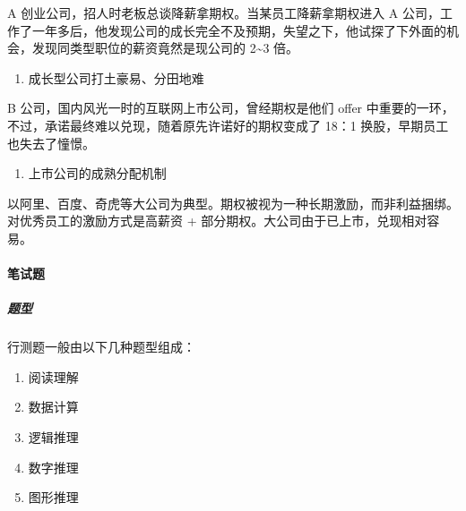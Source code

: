 \documentclass[letterpaper,10pt,english]{sphinxmanual}
\begin{document}
A 创业公司，招人时老板总谈降薪拿期权。当某员工降薪拿期权进入 A
公司，工作了一年多后，他发现公司的成长完全不及预期，失望之下，他试探了下外面的机会，发现同类型职位的薪资竟然是现公司的
2\textasciitilde{}3 倍。
\begin{enumerate}
%
\setcounter{enumi}{1}
\item {} 
成长型公司打土豪易、分田地难

\end{enumerate}

B 公司，国内风光一时的互联网上市公司，曾经期权是他们 offer
中重要的一环，不过，承诺最终难以兑现，随着原先许诺好的期权变成了 18：1
换股，早期员工也失去了憧憬。
\begin{enumerate}
%
\setcounter{enumi}{2}
\item {} 
上市公司的成熟分配机制

\end{enumerate}

以阿里、百度、奇虎等大公司为典型。期权被视为一种长期激励，而非利益捆绑。对优秀员工的激励方式是高薪资
+ 部分期权。大公司由于已上市，兑现相对容易。


\paragraph{笔试题}
\label{\detokenize{chapter_interview/exam:id1}}\label{\detokenize{chapter_interview/exam::doc}}

\subparagraph{题型}
\label{\detokenize{chapter_interview/exam:id2}}
行测题一般由以下几种题型组成：%
\begin{footnote}[850]\sphinxAtStartFootnote
{}
%
\end{footnote}
\begin{enumerate}
%
\item {} 
阅读理解

\item {} 
数据计算

\item {} 
逻辑推理

\item {} 
数字推理

\item {} 
图形推理

\end{enumerate}
\end{document}
